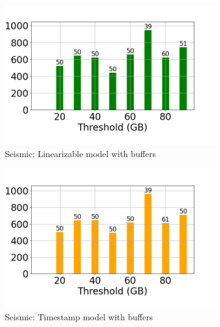 \begin{figure}
	\centering
	\begin{subfigure}[c]{0.48\textwidth}
		\includegraphics[width=1\textwidth]   {figures/Experiments/Dynamic/SEISMIC/35/average_query_time_per_batch_version_999777015_10485760_10_delay[35].png}
		\caption{Seismic: Linearizable model with buffers}
		\label{fig:logical-ts-35-seismic}
	\end{subfigure}
	\begin{subfigure}[c]{0.48\textwidth}
		\includegraphics[width=1\textwidth]	 {figures/Experiments/Dynamic/SEISMIC/35/average_query_time_per_batch_version_999777018_10485760_10_delay[35].png}
		\caption{Seismic: Timestamp model with buffers}
		\label{fig:system-ts-35-seismic}
	\end{subfigure}
	\begin{subfigure}[c]{0.48\textwidth}

\end{subfigure}
\end{figure}
